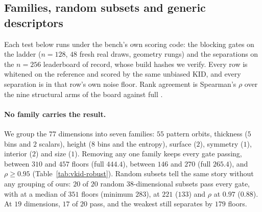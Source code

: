 \subsection{Families, random subsets and generic descriptors}

Each test below runs under the bench's own scoring code: the blocking gates on the ladder
($n{=}128$, $48$ fresh real draws, geometry rungs) and the separations on the $n{=}256$
leaderboard of record, whose build hashes we verify. Every row is whitened on the reference
and scored by the same unbiased KID, and every separation is in that row's own noise floor.
Rank agreement is Spearman's $\rho$ over the nine structural arms of the board against full
\vkid{}.

\paragraph{No family carries the result.}
We group the $77$ dimensions into seven families: $55$ pattern orbits, thickness ($5$
bins and $2$ scalars), height ($8$ bins and the entropy), surface ($2$), symmetry ($1$),
interior ($2$) and size ($1$). Removing any one family keeps every gate passing,
\solidify{} between $310$ and $457$ floors (full $444.4$), \hollow{} between $146$ and
$270$ (full $265.4$), and $\rho \geq 0.95$ (Table~\ref{tab:vkid-robust}). Random subsets
tell the same story without any grouping of ours: $20$ of $20$ random $38$-dimensional
subsets pass every gate, with \solidify{} at a median of $351$ floors (minimum $283$),
\hollow{} at $221$ ($133$) and $\rho$ at $0.97$ ($0.88$). At $19$ dimensions, $17$ of $20$
pass, and the weakest still separates \solidify{} by $179$ floors.

